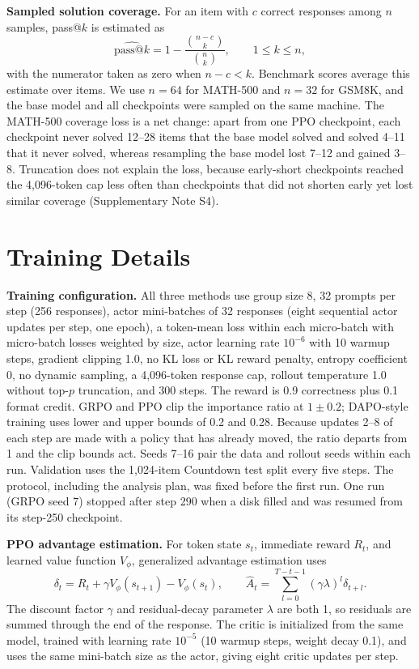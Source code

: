 \documentclass[ai,article,submit,oneauthor]{Definitions/mdpi}
\begin{document}
\noindent\textbf{Sampled solution coverage.}
For an item with $c$ correct responses among $n$ samples, pass@$k$ is estimated as
\begin{equation}
\widehat{\mathrm{pass@}k}=1-\frac{\binom{n-c}{k}}{\binom{n}{k}},\qquad 1\leq k\leq n,
\end{equation}
with the numerator taken as zero when $n-c<k$. Benchmark scores average this estimate over items. We use $n=64$ for MATH-500 and $n=32$ for GSM8K, and the base model and all checkpoints were sampled on the same machine. The MATH-500 coverage loss is a net change: apart from one PPO checkpoint, each checkpoint never solved 12--28 items that the base model solved and solved 4--11 that it never solved, whereas resampling the base model lost 7--12 and gained 3--8. Truncation does not explain the loss, because early-short checkpoints reached the 4,096-token cap less often than checkpoints that did not shorten early yet lost similar coverage (Supplementary Note S4).

\section{Training Details}\label{app:training_details}

\noindent\textbf{Training configuration.}
All three methods use group size 8, 32 prompts per step (256 responses), actor mini-batches of 32 responses (eight sequential actor updates per step, one epoch), a token-mean loss within each micro-batch with micro-batch losses weighted by size, actor learning rate $10^{-6}$ with 10 warmup steps, gradient clipping 1.0, no KL loss or KL reward penalty, entropy coefficient 0, no dynamic sampling, a 4,096-token response cap, rollout temperature 1.0 without top-$p$ truncation, and 300 steps. The reward is 0.9 correctness plus 0.1 format credit. GRPO and PPO clip the importance ratio at $1\pm0.2$; DAPO-style training uses lower and upper bounds of 0.2 and 0.28. Because updates 2--8 of each step are made with a policy that has already moved, the ratio departs from 1 and the clip bounds act. Seeds 7--16 pair the data and rollout seeds within each run. Validation uses the 1,024-item Countdown test split every five steps. The protocol, including the analysis plan, was fixed before the first run. One run (GRPO seed 7) stopped after step 290 when a disk filled and was resumed from its step-250 checkpoint.

\noindent\textbf{PPO advantage estimation.}
For token state $s_t$, immediate reward $R_t$, and learned value function $V_\phi$, generalized advantage estimation uses
\begin{equation}\label{eq:gae}
\delta_t=R_t+\gamma V_\phi(s_{t+1})-V_\phi(s_t),\qquad
\widehat{A}_t=\sum_{l=0}^{T-t-1}(\gamma\lambda)^l\delta_{t+l}.
\end{equation}
The discount factor $\gamma$ and residual-decay parameter $\lambda$ are both 1, so residuals are summed through the end of the response. The critic is initialized from the same model, trained with learning rate $10^{-5}$ (10 warmup steps, weight decay 0.1), and uses the same mini-batch size as the actor, giving eight critic updates per step.
\end{document}
